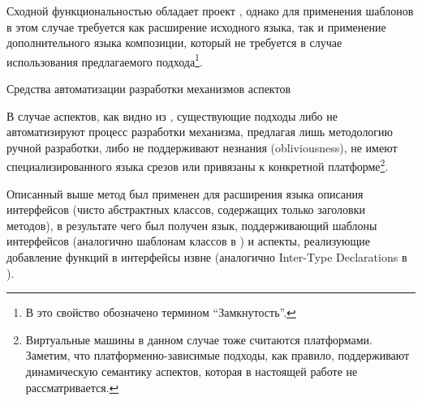 Сходной функциональностью обладает проект , однако для применения шаблонов в этом случае требуется как расширение исходного языка, так и применение дополнительного языка композиции, который не требуется в случае использования предлагаемого подхода\footnote{В  это свойство обозначено термином ``Замкнутость''.}.

\begin{table}[htb]
	\centering
\newcommand{\dissonly}[1]{}
\newcommand{\size}{\small}

	\caption{Средства автоматизации разработки механизмов аспектов}\label{AspTable}
\end{table}

В случае аспектов, как видно из , существующие подходы либо не автоматизируют процесс разработки механизма, предлагая лишь методологию ручной разработки, либо не поддерживают незнания (obliviousness), не имеют специализированного языка срезов или привязаны к конкретной платформе\footnote{ Виртуальные машины в данном случае тоже считаются платформами. Заметим, что платформенно-зависимые подходы, как правило, поддерживают динамическую семантику аспектов, которая в настоящей работе не рассматривается.}. 

Описанный выше метод был применен для расширения языка описания интерфейсов (чисто абстрактных классов, содержащих только заголовки методов), в результате чего был получен язык, поддерживающий шаблоны интерфейсов (аналогично шаблонам классов в ) и аспекты, реализующие добавление функций в интерфейсы извне (аналогично Inter-Type Declarations в ).